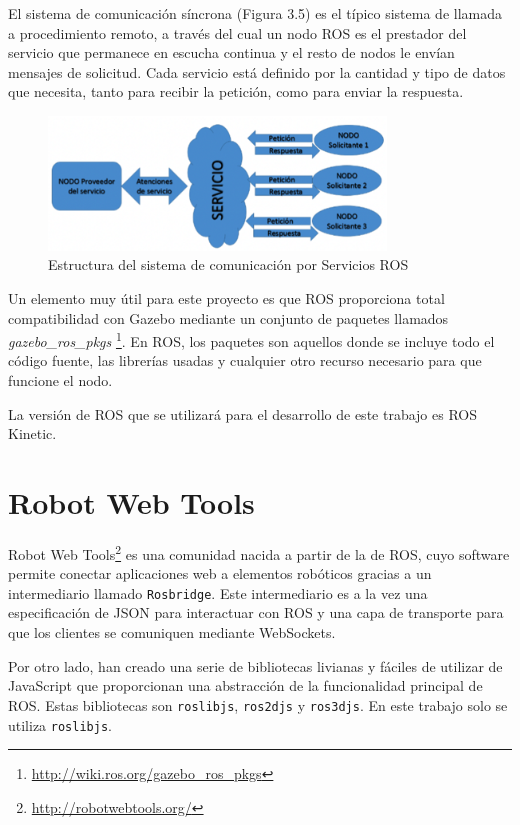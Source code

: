 El sistema de comunicación síncrona (Figura 3.5) es el típico sistema de llamada a procedimiento remoto, a través del cual un nodo ROS es el prestador del servicio que permanece en escucha continua y el resto de nodos le envían mensajes de solicitud. Cada servicio está definido por la cantidad y tipo de datos que necesita, tanto para recibir la petición, como para enviar la respuesta.

\begin{figure}[H]
  \begin{center}
    \includegraphics[width=0.8\textwidth]{figures/serviciosros.png}
		\caption{Estructura del sistema de comunicación por Servicios ROS}
		\label{fig.serviciosros}
		\end{center}
\end{figure}

Un elemento muy útil para este proyecto es que ROS proporciona total compatibilidad con Gazebo mediante un conjunto de paquetes llamados \textit{gazebo\_ros\_pkgs} \footnote{\url{http://wiki.ros.org/gazebo_ros_pkgs}}. En ROS, los paquetes son aquellos donde se incluye todo el código fuente, las librerías usadas y cualquier otro recurso necesario para que funcione el nodo.

La versión de ROS que se utilizará para el desarrollo de este trabajo es ROS Kinetic.

\section{Robot Web Tools}
Robot Web Tools\footnote{\url{http://robotwebtools.org/}} es una comunidad nacida a partir de la de ROS, cuyo software permite conectar aplicaciones web a elementos robóticos gracias a un intermediario llamado \texttt{Rosbridge}. Este intermediario es a la vez una especificación de JSON para interactuar con ROS y una capa de transporte para que los clientes se comuniquen mediante WebSockets. 

Por otro lado, han creado una serie de bibliotecas livianas y fáciles de utilizar de JavaScript que proporcionan una abstracción de la funcionalidad principal de ROS. Estas bibliotecas son \texttt{roslibjs}, \texttt{ros2djs} y \texttt{ros3djs}. En este trabajo solo se utiliza \texttt{roslibjs}.

